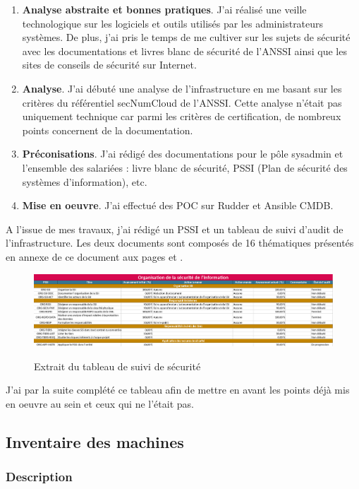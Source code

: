 \documentclass[12pt]{article}
\begin{document}
\begin{enumerate}
    \item \textbf{Analyse abstraite et bonnes pratiques}. J'ai réalisé une veille technologique sur les logiciels et outils utilisés par les administrateurs systèmes. 
    De plus, j'ai pris le temps de me cultiver sur les sujets de sécurité avec les documentations et livres blanc de sécurité de l'ANSSI ainsi que les sites de conseils de sécurité sur Internet.
    \item \textbf{Analyse}. J'ai débuté une analyse de l'infrastructure en me basant sur les critères du référentiel secNumCloud de l'ANSSI. 
    Cette analyse n'était pas uniquement technique car parmi les critères de certification, de nombreux points concernent de la documentation.
    \item \textbf{Préconisations}. J'ai rédigé des documentations pour le pôle \gls{sysadmin} et l'ensemble des salariées : livre blanc de sécurité, PSSI (Plan de sécurité des systèmes d'information), etc.
    \item \textbf{Mise en oeuvre}. J'ai effectué des \gls{POC} sur Rudder et Ansible CMDB.
\end{enumerate}

A l'issue de mes travaux, j'ai rédigé un PSSI et un tableau de suivi d'audit de l'infrastructure. 
Les deux documents sont composés de 16 thématiques présentés en annexe de ce document aux pages \pageref{tab:16thematiques1} et \pageref{tab:16thematiques2}.
\begin{figure}[!ht]
    \centering
    \includegraphics[width=\textwidth]{src/table_example.png}
    \label{fig:pssi_table}
    \caption{Extrait du tableau de suivi de sécurité}
\end{figure}

J'ai par la suite complété ce tableau afin de mettre en avant les points déjà mis en oeuvre au sein et ceux qui ne l'était pas.

\newpage
\subsection{Inventaire des machines}
\subsubsection{Description}
\end{document}
